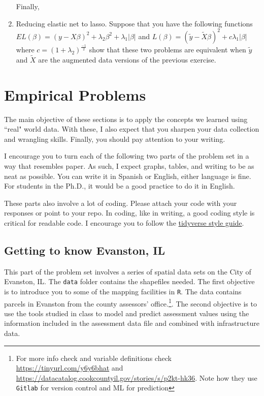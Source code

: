 \documentclass[12pt]{article}
\begin{document}
\begin{enumerate}
Finally, 
\\

  \item Reducing elastic net to lasso. Suppose that you have the following functions $EL(\beta) = (y-X\beta)^2+ \lambda_2 \beta^2+ \lambda_1|\beta|$ and $L(\beta) = (\tilde{y}-\tilde{X}\beta)^2+ c \lambda_1|\beta|$ where $c=(1+\lambda_2)^{\frac{-1}{2}}$ show that these two problems are equivalent when $\tilde{y}$ and $\tilde{X}$ are the augmented data versions of the previous exercise.
\end{enumerate}

\section{Empirical Problems}

The main objective of these sections is to apply the concepts we learned using ``real" world data. With these, I also expect that you sharpen your data collection and wrangling skills. Finally, you should pay attention to your writing.

I encourage you to turn each of the following two parts of the problem set in a way that resembles paper. As such, I expect graphs, tables, and writing to be as neat as possible. You can write it in Spanish or English, either language is fine. For students in the Ph.D., it would be a good practice to do it in English.

These parts also involve a lot of coding. Please attach your code with your responses or point to your repo. In coding, like in writing, a good coding style is critical for readable code. I encourage you to follow the \href{https://style.tidyverse.org/}{tidyverse style guide}.


\subsection{Getting to know Evanston, IL}

This part of the problem set involves a series of spatial data sets on the City of Evanston, IL. The \texttt{data} folder contains the shapefiles needed. The first objective is to introduce you to some of the mapping facilities in \texttt{R}.  The data contains parcels in Evanston from the county assessors' office.\footnote{For more info check and variable definitions check \url{https://tinyurl.com/y6y6bhat} and \url{https://datacatalog.cookcountyil.gov/stories/s/p2kt-hk36}. Note how they use \texttt{Gitlab} for version control and ML for prediction}. The second objective is to use the tools studied in class to model and predict assessment values using the information included in the assessment data file and combined with infrastructure data.
\end{document}
